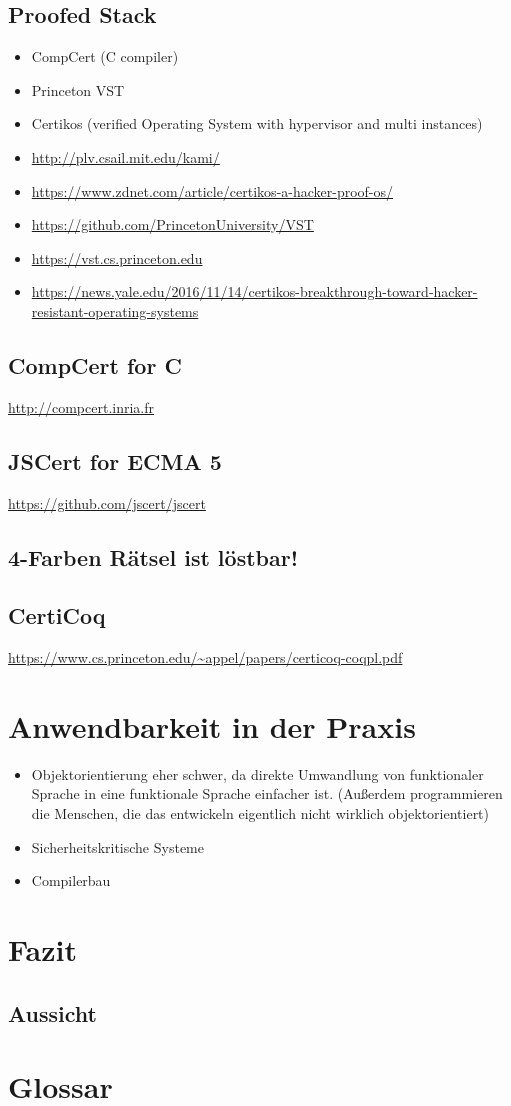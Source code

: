 \subsection{Proofed Stack}
\begin{itemize}
	\item CompCert (C compiler)
	\item Princeton VST
	\item Certikos (verified Operating System with hypervisor and multi instances)
	\item \url{http://plv.csail.mit.edu/kami/}
	\item \url{https://www.zdnet.com/article/certikos-a-hacker-proof-os/}
	\item \url{https://github.com/PrincetonUniversity/VST}
	\item \url{https://vst.cs.princeton.edu}
	\item \url{https://news.yale.edu/2016/11/14/certikos-breakthrough-toward-hacker-resistant-operating-systems}
\end{itemize}
\subsection{CompCert for C}
\url{http://compcert.inria.fr}
\subsection{JSCert for ECMA 5}
\url{https://github.com/jscert/jscert}
\subsection{4-Farben Rätsel ist löstbar!}
\subsection{CertiCoq}
\url{https://www.cs.princeton.edu/~appel/papers/certicoq-coqpl.pdf}

\section{Anwendbarkeit in der Praxis}
\begin{itemize}
	\item Objektorientierung eher schwer, da direkte Umwandlung von funktionaler Sprache in eine funktionale Sprache einfacher ist. (Außerdem programmieren die Menschen, die das entwickeln eigentlich nicht wirklich objektorientiert)
	\item Sicherheitskritische Systeme
	\item Compilerbau
\end{itemize}


\section{Fazit}
\subsection{Aussicht}

\section{Glossar}


